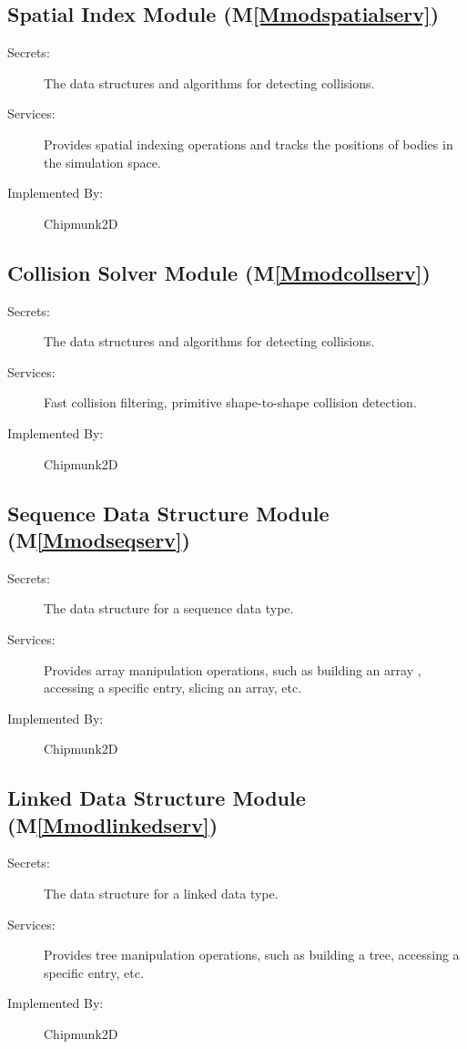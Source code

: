 \documentclass[12pt]{article}
\begin{document}
\subsection{Spatial Index Module (M\ref{Mmodspatialserv})}
\label{Sec:SIM()}
\begin{description}
\item[Secrets:]The data structures and algorithms for detecting collisions.
\item[Services:]Provides spatial indexing operations and tracks the positions of bodies in the simulation space.
\item[Implemented By:]Chipmunk2D
\end{description}
\subsection{Collision Solver Module (M\ref{Mmodcollserv})}
\label{Sec:CSM()}
\begin{description}
\item[Secrets:]The data structures and algorithms for detecting collisions.
\item[Services:]Fast collision filtering, primitive shape-to-shape collision detection.
\item[Implemented By:]Chipmunk2D
\end{description}
\subsection{Sequence Data Structure Module (M\ref{Mmodseqserv})}
\label{Sec:SDSM()}
\begin{description}
\item[Secrets:]The data structure for a sequence data type.
\item[Services:]Provides array manipulation operations, such as building an array , accessing a specific entry, slicing an array, etc.
\item[Implemented By:]Chipmunk2D
\end{description}
\subsection{Linked Data Structure Module (M\ref{Mmodlinkedserv})}
\label{Sec:LDSM()}
\begin{description}
\item[Secrets:]The data structure for a linked data type.
\item[Services:]Provides tree manipulation operations, such as building a tree, accessing a specific entry, etc.
\item[Implemented By:]Chipmunk2D
\end{description}
\end{document}
